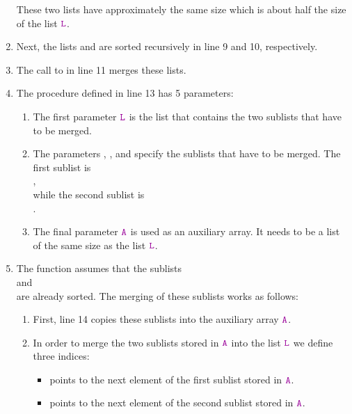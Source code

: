 \begin{enumerate}
      These two lists have approximately the same size which is about half the size of the list $\mytt{L}$.
\item Next, the lists  and  are sorted
      recursively in line 9 and 10, respectively.
\item The call to  in line 11 merges these lists.
\item The procedure  defined in line 13 has 5 parameters: 
      \begin{enumerate}
      \item The first parameter $\mytt{L}$ is the list that contains the two sublists that have to be merged.
      \item The parameters , , and  specify the sublists
            that have to be merged.  The first sublist is 
            \\[0.2cm]
            \hspace*{1.3cm} 
            , 
            \\[0.2cm]
            while the second sublist is \\[0.2cm]
            \hspace*{1.3cm} 
            . 
      \item The final parameter $\mytt{A}$ is used as an auxiliary array.  It needs to be a list of the
            same size as the list $\mytt{L}$.
      \end{enumerate}
\item The function  assumes that the sublists 
      \\[0.2cm]
      \hspace*{1.3cm}
       \quad and \quad {} 
      \\[0.2cm]
      are already sorted.  The merging of these sublists works as follows:
      \begin{enumerate}
      \item First, line 14 copies these sublists into the auxiliary array $\mytt{A}$.
      \item In order to merge the two sublists stored in $\mytt{A}$ into the list $\mytt{L}$ we define
            three indices: 
            \begin{itemize}
            \item {} points to the next element of the first sublist stored in $\mytt{A}$.
            \item {} points to the next element of the second sublist stored in $\mytt{A}$.

\end{itemize}
\end{enumerate}
\end{enumerate}
